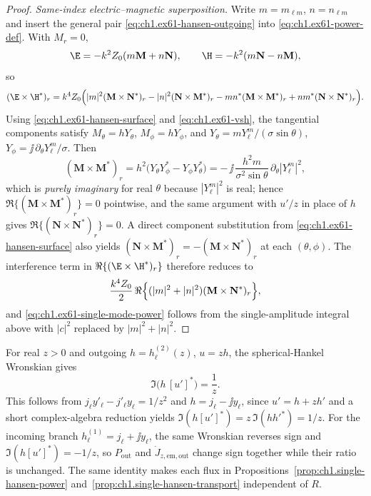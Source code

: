 \begin{proof}
\medskip\noindent\emph{Same-index electric--magnetic superposition.}
Write $m=m_{\ell m}$, $n=n_{\ell m}$ and insert the general pair \eqref{eq:ch1.ex61-hansen-outgoing} into \eqref{eq:ch1.ex61-power-def}. With $M_r=0$,
\[
\E=-k^2 Z_0(m\mathbf M+n\mathbf N),\qquad
\H=-k^2(m\mathbf N-n\mathbf M),
\]
so
\[
(\E\times\H^*)_r
=k^4 Z_0\Bigl(|m|^2(\mathbf M\times\mathbf N^*)_r
-|n|^2(\mathbf N\times\mathbf M^*)_r
-mn^*(\mathbf M\times\mathbf M^*)_r
+n m^*(\mathbf N\times\mathbf N^*)_r\Bigr).
\]
Using \eqref{eq:ch1.ex61-hansen-surface} and \eqref{eq:ch1.ex61-vsh}, the tangential components satisfy $M_\theta=hY_\theta$, $M_\phi=hY_\phi$, and $Y_\theta=m Y_\ell^m/(\sigma\sin\theta)$, $Y_\phi=\jj\,\partial_\theta Y_\ell^m/\sigma$. Then
\[
(\mathbf M\times\mathbf M^*)_r
=h^2\bigl(Y_\theta Y_\phi^*-Y_\phi Y_\theta^*\bigr)
=-\,\jj\,\frac{h^2 m}{\sigma^2\sin\theta}\,\partial_\theta|Y_\ell^m|^2,
\]
which is \emph{purely imaginary} for real $\theta$ because $|Y_\ell^m|^2$ is real; hence $\Re\{(\mathbf M\times\mathbf M^*)_r\}=0$ pointwise, and the same argument with $u'/z$ in place of $h$ gives $\Re\{(\mathbf N\times\mathbf N^*)_r\}=0$. A direct component substitution from \eqref{eq:ch1.ex61-hansen-surface} also yields $(\mathbf N\times\mathbf M^*)_r=-(\mathbf M\times\mathbf N^*)_r$ at each $(\theta,\phi)$. The interference term in $\Re\{(\E\times\H^*)_r\}$ therefore reduces to
\[
\frac{k^4 Z_0}{2}\,\Re\Bigl\{(|m|^2+|n|^2)(\mathbf M\times\mathbf N^*)_r\Bigr\},
\]
and \eqref{eq:ch1.ex61-single-mode-power} follows from the single-amplitude integral above with $|c|^2$ replaced by $|m|^2+|n|^2$.
\end{proof}

For real $z>0$ and outgoing $h=h_\ell^{(2)}(z)$, $u=zh$, the spherical-Hankel Wronskian gives
\begin{equation}
\label{eq:ch1.ex61-hankel-wronskian}
\Im\bigl(h\,[u']^*\bigr)=\frac{1}{z}.
\end{equation}
This follows from $j_\ell y'_\ell-j'_\ell y_\ell=1/z^2$ and $h=j_\ell-\jj y_\ell$, since $u'=h+zh'$ and a short complex-algebra reduction yields $\Im(h[u']^*)=z\,\Im(hh'^*)=1/z$. For the incoming branch $h_\ell^{(1)}=j_\ell+\jj y_\ell$, the same Wronskian reverses sign and $\Im(h[u']^*)=-1/z$, so $P_{\mathrm{out}}$ and $\dot J_{z,\mathrm{em,out}}$ change sign together while their ratio is unchanged. The same identity makes each flux in Propositions~\ref{prop:ch1.single-hansen-power} and~\ref{prop:ch1.single-hansen-transport} independent of $R$.

